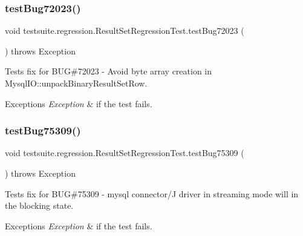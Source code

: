 \subsubsection{\texorpdfstring{test\+Bug72023()}{testBug72023()}}
{\footnotesize\ttfamily void testsuite.\+regression.\+Result\+Set\+Regression\+Test.\+test\+Bug72023 (\begin{DoxyParamCaption}{ }\end{DoxyParamCaption}) throws Exception}

Tests fix for B\+UG\#72023 -\/ Avoid byte array creation in Mysql\+I\+O\+::unpack\+Binary\+Result\+Set\+Row.


\begin{DoxyExceptions}{Exceptions}
{\em Exception} & if the test fails. \\
\hline
\end{DoxyExceptions}
\mbox{\label{classtestsuite_1_1regression_1_1_result_set_regression_test_a21e609d74da6fad0483aeeec66375c7d}} 
\subsubsection{\texorpdfstring{test\+Bug75309()}{testBug75309()}}
{\footnotesize\ttfamily void testsuite.\+regression.\+Result\+Set\+Regression\+Test.\+test\+Bug75309 (\begin{DoxyParamCaption}{ }\end{DoxyParamCaption}) throws Exception}

Tests fix for B\+UG\#75309 -\/ mysql connector/J driver in streaming mode will in the blocking state.


\begin{DoxyExceptions}{Exceptions}
{\em Exception} & if the test fails. \\
\hline
\end{DoxyExceptions}
\mbox{\label{classtestsuite_1_1regression_1_1_result_set_regression_test_ad13bf1855a9ea26c44b830e577097a90}} 
